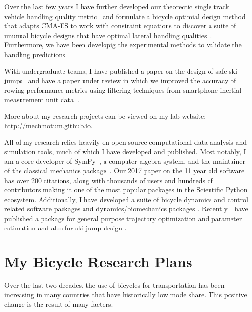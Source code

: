 \documentclass{article}
\begin{document}
Over the last few years I have further developed our theorectic single track
vehicle handling quality metric~\cite{Hess2012} and formulate a bicycle
optimial design method that adapts CMA-ES to work with constraint equations to
discover a suite of ununual bicycle designs that have optimal lateral handling
qualities~\cite{Moore2016,Moore2019a}. Furthermore, we have been developig the
experimental methods to validate the handling
predictions~\cite{Kresie2017,Gilboa2019a}

With undergraduate teams, I have published a paper on the design of safe ski
jumps~\cite{Moore2018} and have a paper under review in which we improved the
accuracy of rowing performance metrics using filtering techniques from
smartphone inertial measurement unit data~\cite{Cloud2019b}.

More about my research projects can be viewed on my lab website:
\url{http://mechmotum.github.io}.

All of my research relies heavily on open source computational data analysis
and simulation tools, much of which I have developed and published. Most
notably, I am a core developer of SymPy~\cite{SymPyDevelopmentTeam2006}, a
computer algebra system, and the maintainer of the classical mechanics
package~\cite{Gede2013}. Our 2017 paper \cite{Meurer2017} on the 11 year old
software has over 200 citations, along with thousands of users and hundreds of
contributors making it one of the most popular packages in the Scientific
Python ecosystem.  Additionally, I have developed a suite of bicycle dynamics
and control related software packages
\cite{Moore2010b,Moore2011d,Moore2011a,Moore2011e} and dynamics/biomechanics
packages \cite{Dembia2011,Moore2011,Moore2011b} \cite{Moore2013b}
\cite{Moore2017b} \cite{Moore2018a}. Recently I have published a package for
general purpose trajectory optimization and parameter estimation
\cite{Moore2018} and also for ski jump design \cite{Moore2018a}.

\section*{My Bicycle Research Plans}
%
Over the last two decades, the use of bicycles for transportation has been
increasing in many countries that have historically low mode share. This
positive change is the result of many factors.
\end{document}
